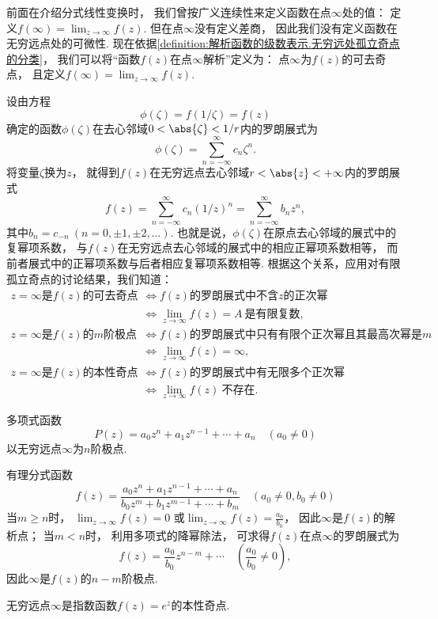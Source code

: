 前面在介绍分式线性变换时，
我们曾按广义连续性来定义函数在点\(\infty\)处的值：
定义\(f(\infty) = \lim_{z\to\infty} f(z)\).
但在点\(\infty\)没有定义差商，
因此我们没有定义函数在无穷远点处的可微性.
现在依据\cref{definition:解析函数的级数表示.无穷远处孤立奇点的分类}，
我们可以将“函数\(f(z)\)在点\(\infty\)解析”定义为：
点\(\infty\)为\(f(z)\)的可去奇点，
且定义\(f(\infty) = \lim_{z\to\infty} f(z)\).

设由方程\[
	\phi(\zeta) = f(1/\zeta) = f(z)
\]
确定的函数\(\phi(\zeta)\)在去心邻域\(0<\abs{\zeta}<1/r\)内的罗朗展式为\[
	\phi(\zeta) = \sum_{n=-\infty}^\infty c_n \zeta^n.
\]
将变量\(\zeta\)换为\(z\)，
就得到\(f(z)\)在无穷远点去心邻域\(r<\abs{z}<+\infty\)内的罗朗展式\[
	f(z) = \sum_{n=-\infty}^\infty c_n (1/z)^n
	= \sum_{n=-\infty}^\infty b_n z^n,
\]
其中\(b_n = c_{-n}\ (n=0,\pm1,\pm2,\dotsc)\).
也就是说，\(\phi(\zeta)\)在原点去心邻域的展式中的复幂项系数，
与\(f(z)\)在无穷远点去心邻域的展式中的相应正幂项系数相等，
而前者展式中的正幂项系数与后者相应复幂项系数相等.
根据这个关系，应用对有限孤立奇点的讨论结果，我们知道：
\begin{align*}
	\text{\(z=\infty\)是\(f(z)\)的可去奇点}
	&\iff
	\text{\(f(z)\)的罗朗展式中不含\(z\)的正次幂} \\
	&\iff
	\lim_{z\to\infty} f(z) = A~\text{是有限复数}, \\
	\text{\(z=\infty\)是\(f(z)\)的\(m\)阶极点}
	&\iff
	\text{\(f(z)\)的罗朗展式中只有有限个正次幂且其最高次幂是\(m\)} \\
	&\iff
	\lim_{z\to\infty} f(z) = \infty, \\
	\text{\(z=\infty\)是\(f(z)\)的本性奇点}
	&\iff
	\text{\(f(z)\)的罗朗展式中有无限多个正次幂} \\
	&\iff
	\lim_{z\to\infty} f(z)~\text{不存在}.
\end{align*}

\begin{example}
多项式函数\[
	P(z) = a_0 z^n + a_1 z^{n-1} + \dotsb + a_n
	\quad(a_0\neq0)
\]以无穷远点\(\infty\)为\(n\)阶极点.
\end{example}

\begin{example}
有理分式函数\[
	f(z) = \frac{a_0 z^n + a_1 z^{n-1} + \dotsb + a_n}{b_0 z^m + b_1 z^{m-1} + \dotsb + b_m}
	\quad(a_0\neq0,b_0\neq0)
\]
当\(m \geq n\)时，
\(\lim_{z\to\infty} f(z) = 0\)
或\(\lim_{z\to\infty} f(z) = \frac{a_0}{b_0}\)，
因此\(\infty\)是\(f(z)\)的解析点；
当\(m<n\)时，
利用多项式的降幂除法，
可求得\(f(z)\)在点\(\infty\)的罗朗展式为\[
	f(z) = \frac{a_0}{b_0} z^{n-m} + \dotsb
	\quad(\frac{a_0}{b_0}\neq0),
\]
因此\(\infty\)是\(f(z)\)的\(n-m\)阶极点.
\end{example}

\begin{example}
无穷远点\(\infty\)是指数函数\(f(z) = e^z\)的本性奇点.
\end{example}
